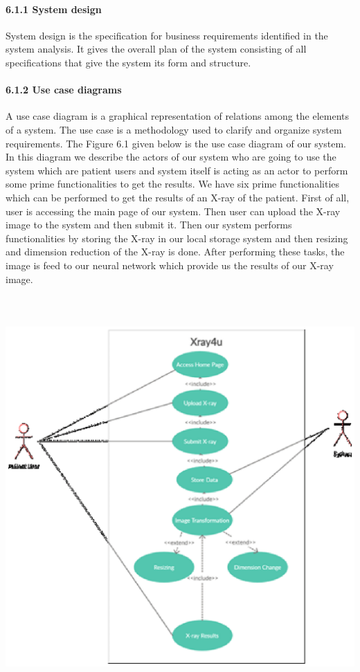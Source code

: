 \documentclass{article} %
\begin{document}
\noindent 
\paragraph{6.1.1 System design}

\noindent System design is the specification for business requirements identified in the system analysis. It gives the overall plan of the system consisting of all specifications that give the system its form and structure.

\noindent 
\paragraph{6.1.2 Use case diagrams}

\noindent A use case diagram is a graphical representation of relations among the elements of a system. The use case is a methodology used to clarify and organize system requirements. The Figure 6.1 given below is the use case diagram of our system. In this diagram we describe the actors of our system who are going to use the system which are patient users and system itself is acting as an actor to perform some prime functionalities to get the results. We have six prime functionalities which can be performed to get the results of an X-ray of the patient. First of all, user is accessing the main page of our system. Then user can upload the X-ray image to the system and then submit it. Then our system performs functionalities by storing the X-ray in our local storage system and then resizing and dimension reduction of the X-ray is done. After performing these tasks, the image is feed to our neural network which provide us the results of our X-ray image.

\noindent 

\noindent  \includegraphics*[width=6.26in, height=6.05in, keepaspectratio=false]{image28}
\end{document}
